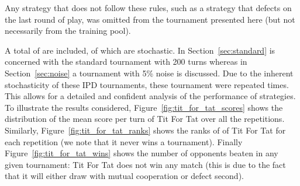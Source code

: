 \documentclass{article}
\begin{document}
Any strategy that does not follow these rules, such as a strategy that defects
on the last round of play, was omitted from the tournament presented here (but
not necessarily from the training pool).

A total of are included, of which
are stochastic.  In
Section~\ref{sec:standard} is concerned with the standard tournament with 200
turns whereas in Section~\ref{sec:noise} a tournament with 5\% noise is
discussed. Due to the inherent stochasticity of these IPD tournaments, these
tournament were repeated 
times. This allows for a detailed and confident analysis of the performance of
strategies. To illustrate the results considered,
Figure~\ref{fig:tit_for_tat_scores} shows the distribution of the mean score per
turn of Tit For Tat over all the repetitions. Similarly,
Figure~\ref{fig:tit_for_tat_ranks} shows the ranks of of Tit For Tat for each
repetition (we note that it never wins a tournament). Finally
Figure~\ref{fig:tit_for_tat_wins} shows the number of opponents beaten in any given
tournament: Tit For Tat does not win any match (this is due to the fact that it
will either draw with mutual cooperation or defect second).
\end{document}
